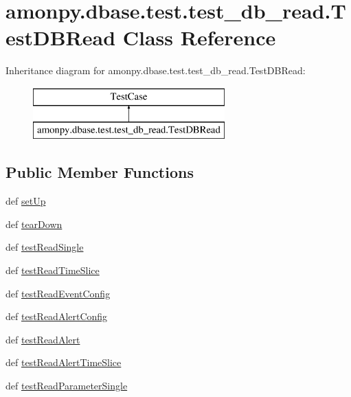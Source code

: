 \hypertarget{classamonpy_1_1dbase_1_1test_1_1test__db__read_1_1_test_d_b_read}{\section{amonpy.\-dbase.\-test.\-test\-\_\-db\-\_\-read.\-Test\-D\-B\-Read Class Reference}
\label{classamonpy_1_1dbase_1_1test_1_1test__db__read_1_1_test_d_b_read}
}
Inheritance diagram for amonpy.\-dbase.\-test.\-test\-\_\-db\-\_\-read.\-Test\-D\-B\-Read\-:\begin{figure}[H]
\begin{center}
\leavevmode
\includegraphics[height=2.000000cm]{classamonpy_1_1dbase_1_1test_1_1test__db__read_1_1_test_d_b_read}
\end{center}
\end{figure}
\subsection*{Public Member Functions}
\begin{DoxyCompactItemize}
\item 
def \hyperlink{classamonpy_1_1dbase_1_1test_1_1test__db__read_1_1_test_d_b_read_a3d42ef1ed1ec53504c475d0db682fc1e}{set\-Up}
\item 
def \hyperlink{classamonpy_1_1dbase_1_1test_1_1test__db__read_1_1_test_d_b_read_a5e6de8d1c39f5c64ac66b5329d7803ba}{tear\-Down}
\item 
def \hyperlink{classamonpy_1_1dbase_1_1test_1_1test__db__read_1_1_test_d_b_read_a8eef1ba4193c4b630467e5cc4356e326}{test\-Read\-Single}
\item 
def \hyperlink{classamonpy_1_1dbase_1_1test_1_1test__db__read_1_1_test_d_b_read_af5b8a121cd312c79b9a96f14225895cd}{test\-Read\-Time\-Slice}
\item 
def \hyperlink{classamonpy_1_1dbase_1_1test_1_1test__db__read_1_1_test_d_b_read_ad58e247d7332ccd18c21296b68ef3944}{test\-Read\-Event\-Config}
\item 
def \hyperlink{classamonpy_1_1dbase_1_1test_1_1test__db__read_1_1_test_d_b_read_a88bf26659e5ad77f96e49347e527ea1c}{test\-Read\-Alert\-Config}
\item 
def \hyperlink{classamonpy_1_1dbase_1_1test_1_1test__db__read_1_1_test_d_b_read_a9e83f573f0f9825c75e585d2e6707283}{test\-Read\-Alert}
\item 
def \hyperlink{classamonpy_1_1dbase_1_1test_1_1test__db__read_1_1_test_d_b_read_a521e28d6ad16e03b0a6ad6cbfe06f725}{test\-Read\-Alert\-Time\-Slice}
\item 
def \hyperlink{classamonpy_1_1dbase_1_1test_1_1test__db__read_1_1_test_d_b_read_a21c5b2538f4d5adee20f64bc377d7905}{test\-Read\-Parameter\-Single}
\end{DoxyCompactItemize}
